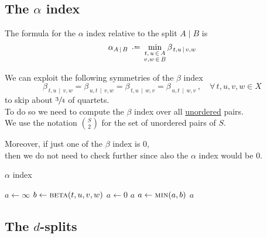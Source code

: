 \documentclass[./main.tex]{subfiles}
\begin{document}
\clearpage


\subsection*{The $\alpha$ index}

The formula for the $\alpha$ index relative to the split $A \mathbin{|} B$ is
\[ \alpha_{A \,\mathbin{|}\, B} \,\defeq\, \min_{\substack{t,\,u \,\in\, A \\ v,w \,\in\, B}}{\beta_{\, t,u \,\mathbin{|}\, v,w}} \]

We can exploit the following symmetries of the $\beta$ index
\[ \beta_{\, t,u \,\mathbin{|}\, v,w} = \beta_{\, u,t \,\mathbin{|}\, v,w} = \beta_{\, t,u \,\mathbin{|}\, w,v} = \beta_{\, u,t \,\mathbin{|}\, w,v} \,, \quad \forall\, t,u,v,w \in X \]
to skip about $\sfrac{3}{4}$ of quartets. \\[3pt]
To do so we need to compute the $\beta$ index over all \underline{unordered} pairs. \\[3pt]
We use the notation $\binom{S}{2}$ for the set of unordered pairs of $S$.

Moreover, if just one of the $\beta$ index is $0$, \\
\bsp then we do not need to check further since also the $\alpha$ index would be $0$.\bigskip

\begin{algorithm}
\caption{$\alpha$ index}
\begin{algorithmic}[1]
        \State $a \gets \infty$ 
         
             
                \State $b \gets \Call{beta}{t,u,v,w}$
                    \State $a \gets 0$
                    \State \Return $a$
                \Else
                    \State $a \gets \Call{min}{a,b}$
                \EndIf
            \EndFor
        \EndFor
        \State \Return $a$
    \EndFunction
\end{algorithmic}
\end{algorithm}

\clearpage


\subsection*{The $d$-splits}
\end{document}
